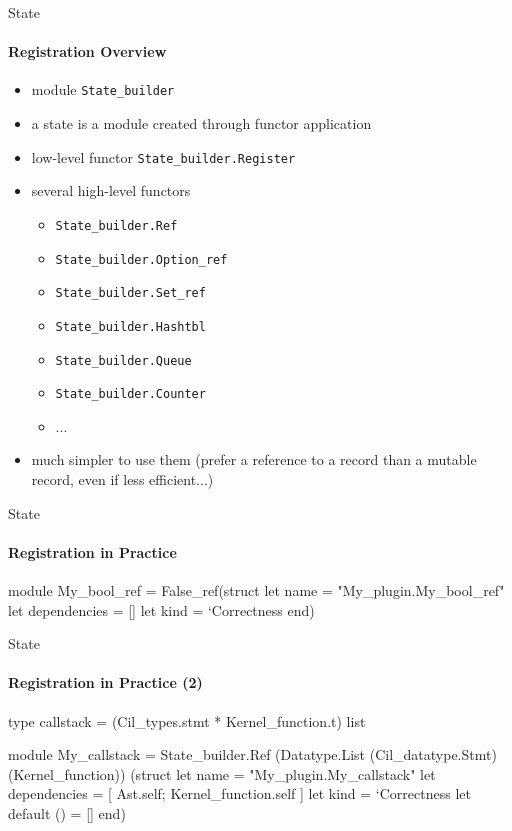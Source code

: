 
\begin{frame}[fragile]{State}
  \framesubtitle{Registration Overview}

\begin{itemize}
\item module \lstinline+State_builder+
\item a state is a module created through functor application
\item low-level functor \lstinline+State_builder.Register+
\item several high-level functors
  \begin{itemize}
  \item \lstinline+State_builder.Ref+
  \item \lstinline+State_builder.Option_ref+
  \item \lstinline+State_builder.Set_ref+
  \item \lstinline+State_builder.Hashtbl+
  \item \lstinline+State_builder.Queue+
  \item \lstinline+State_builder.Counter+
  \item ...
  \end{itemize}
\item much simpler to use them (prefer a reference to a record than a mutable
  record, even if less efficient...)
\end{itemize}

\end{frame}


\begin{frame}[fragile]{State}
  \framesubtitle{Registration in Practice}

\begin{ocamlcode}
module My_bool_ref = 
  False_ref(struct
    let name = "My_plugin.My_bool_ref"
    let dependencies = []
    let kind = `Correctness
  end)
\end{ocamlcode}

\end{frame}


\begin{frame}[fragile]{State}
  \framesubtitle{Registration in Practice (2)}

\begin{ocamlcode}
type callstack = 
  (Cil_types.stmt * Kernel_function.t) list

module My_callstack =
  State_builder.Ref
    (Datatype.List
      (Cil_datatype.Stmt)(Kernel_function))
    (struct 
      let name = "My_plugin.My_callstack"
      let dependencies = 
        [ Ast.self; Kernel_function.self ]
      let kind = `Correctness
      let default () = []
     end)
\end{ocamlcode}

\end{frame}

